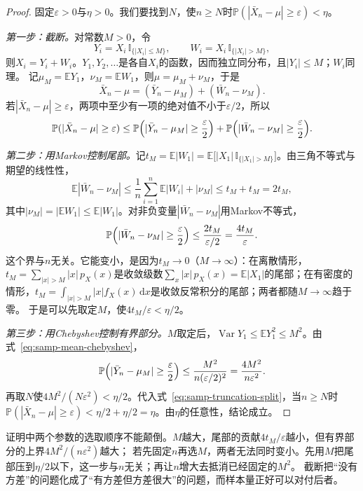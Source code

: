\begin{proof}
固定$\varepsilon>0$与$\eta>0$。我们要找到$N$，使$n\geq N$时$\mathbb{P}(|\bar X_n-\mu|\geq\varepsilon)<\eta$。

\emph{第一步：截断。}对常数$M>0$，令
\[
  Y_i=X_i\,\mathbb{I}_{\{|X_i|\leq M\}},\qquad W_i=X_i\,\mathbb{I}_{\{|X_i|>M\}},
\]
则$X_i=Y_i+W_i$。$Y_1,Y_2,\dots$是各自$X_i$的函数，因而独立同分布，且$|Y_i|\leq M$；$W_i$同理。
记$\mu_M=\mathbb{E}Y_1$，$\nu_M=\mathbb{E}W_1$，则$\mu=\mu_M+\nu_M$，于是
\[
  \bar X_n-\mu=(\bar Y_n-\mu_M)+(\bar W_n-\nu_M).
\]
若$|\bar X_n-\mu|\geq\varepsilon$，两项中至少有一项的绝对值不小于$\varepsilon/2$，所以
\begin{equation}
  \mathbb{P}(|\bar X_n-\mu|\geq\varepsilon)\leq\mathbb{P}\Bigl(|\bar Y_n-\mu_M|\geq\frac\varepsilon2\Bigr)+\mathbb{P}\Bigl(|\bar W_n-\nu_M|\geq\frac\varepsilon2\Bigr).
  \label{eq:samp-truncation-split}
\end{equation}

\emph{第二步：用Markov控制尾部。}记$t_M=\mathbb{E}|W_1|=\mathbb{E}\bigl[|X_1|\,\mathbb{I}_{\{|X_1|>M\}}\bigr]$。由三角不等式与期望的线性性，
\[
  \mathbb{E}|\bar W_n-\nu_M|\leq\frac1n\sum_{i=1}^n\mathbb{E}|W_i|+|\nu_M|\leq t_M+t_M=2t_M,
\]
其中$|\nu_M|=|\mathbb{E}W_1|\leq\mathbb{E}|W_1|$。对非负变量$|\bar W_n-\nu_M|$用Markov不等式，
\[
  \mathbb{P}\Bigl(|\bar W_n-\nu_M|\geq\frac\varepsilon2\Bigr)\leq\frac{2t_M}{\varepsilon/2}=\frac{4t_M}{\varepsilon}.
\]
这个界与$n$无关。它能变小，是因为$t_M\to0$（$M\to\infty$）：在离散情形，$t_M=\sum_{|x|>M}|x|\,p_{X}(x)$是收敛级数$\sum_x|x|\,p_X(x)=\mathbb{E}|X_1|$的尾部；在有密度的情形，$t_M=\int_{|x|>M}|x|f_X(x)\,\mathrm{d}x$是收敛反常积分的尾部；两者都随$M\to\infty$趋于零。
于是可以先取定$M$，使$4t_M/\varepsilon<\eta/2$。

\emph{第三步：用Chebyshev控制有界部分。}$M$取定后，$\operatorname{Var}Y_1\leq\mathbb{E}Y_1^2\leq M^2$。由式~\eqref{eq:samp-mean-chebyshev}，
\[
  \mathbb{P}\Bigl(|\bar Y_n-\mu_M|\geq\frac\varepsilon2\Bigr)\leq\frac{M^2}{n(\varepsilon/2)^2}=\frac{4M^2}{n\varepsilon^2}.
\]
再取$N$使$4M^2/(N\varepsilon^2)<\eta/2$。代入式~\eqref{eq:samp-truncation-split}，当$n\geq N$时$\mathbb{P}(|\bar X_n-\mu|\geq\varepsilon)<\eta/2+\eta/2=\eta$。由$\eta$的任意性，结论成立。
\end{proof}

证明中两个参数的选取顺序不能颠倒。$M$越大，尾部的贡献$4t_M/\varepsilon$越小，但有界部分的上界$4M^2/(n\varepsilon^2)$越大；
若先固定$n$再选$M$，两者无法同时变小。先用$M$把尾部压到$\eta/2$以下，这一步与$n$无关；再让$n$增大去抵消已经固定的$M^2$。
截断把“没有方差”的问题化成了“有方差但方差很大”的问题，而样本量正好可以对付后者。

